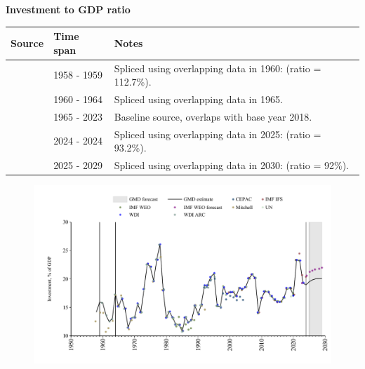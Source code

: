 \documentclass[12pt,a4paper,landscape]{article}
\begin{document}
\begin{adjustbox}{max totalsize={\paperwidth}{\paperheight},center}
\begin{minipage}[t][\textheight][t]{\textwidth}
\vspace*{0.5cm}
{}
\begin{center}
{\Large\bfseries Investment to GDP ratio}
\end{center}
\vspace{0.5cm}
\begin{table}[H]
\centering
\small
\begin{tabular}{|l|l|l|}
\hline
\textbf{Source} & \textbf{Time span} & \textbf{Notes} \\
\hline
\rowcolor{white}\cite{Mitchell}& 1958 - 1959 &Spliced using overlapping data in 1960: (ratio = 112.7\%). \\
\rowcolor{lightgray}\cite{WDI_ARC}& 1960 - 1964 &Spliced using overlapping data in 1965. \\
\rowcolor{white}\cite{WDI}& 1965 - 2023 &Baseline source, overlaps with base year 2018. \\
\rowcolor{lightgray}\cite{IMF_IFS}& 2024 - 2024 &Spliced using overlapping data in 2025: (ratio = 93.2\%). \\
\rowcolor{white}\cite{IMF_WEO_forecast}& 2025 - 2029 &Spliced using overlapping data in 2030: (ratio = 92\%). \\
\hline
\end{tabular}
\end{table}
\begin{figure}[H]
\centering
\includegraphics[width=\textwidth,height=0.6\textheight,keepaspectratio]{graphs/SLV_inv_GDP.pdf}
\end{figure}
\end{minipage}
\end{adjustbox}
\end{document}

